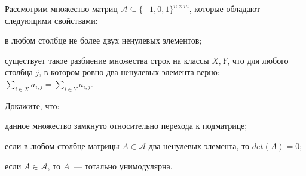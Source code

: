 Рассмотрим множество матриц $\mathcal{A} \subseteq \{-1, 0, 1\}^{n \times m}$, которые обладают следующими свойствами:
\begin{itemtask}
    \item в любом столбце не более двух ненулевых элементов;
    \item существует такое разбиение множества строк на классы $X, Y$, что для любого столбца $j$, в котором ровно два
	    ненулевых элемента верно: $\sum\limits_{i \in X}{a_{i,j}} = \sum\limits_{i \in Y}{a_{i, j}}$.
\end{itemtask}
    
Докажите, что:
\begin{enumcyr}
	\item данное множество замкнуто относительно перехода к подматрице;
    \item если в любом столбце матрицы $A \in \mathcal{A}$ два ненулевых элемента, то $det(A) = 0$;
    \item если $A \in \mathcal{A}$, то $A$~--- тотально унимодулярна.
\end{enumcyr}